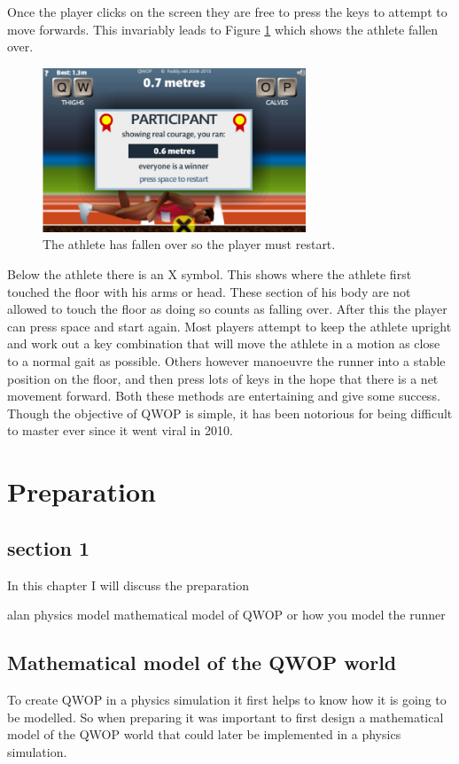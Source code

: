 \documentclass[12pt,a4paper,twoside,openright]{report}
\begin{document}
Once the player clicks on the screen they are free to press the keys to attempt to move forwards. This invariably leads to Figure \ref{fallen} which shows the athlete fallen over. 
\begin{figure}[htbp]
	\centering
	\includegraphics[width=0.7\textwidth]{qwopFallen.PNG}
	\caption{The athlete has fallen over so the player must restart.}
	\label{fallen}
\end{figure}
Below the athlete there is an X symbol. This shows where the athlete first touched the floor with his arms or head. These section of his body are not allowed to touch the floor as doing so counts as falling over. After this the player can press space and start again.
Most players attempt to keep the athlete upright and work out a key combination that will move the athlete in a motion as close to a normal gait as possible.
Others however manoeuvre the runner into a stable position on the floor, and then press lots of keys in the hope that there is a net movement forward.
Both these methods are entertaining and give some success.
Though the objective of QWOP is simple, it has been notorious for being difficult to master ever since it went viral in 2010.




\chapter{Preparation}
\section{section 1}

In this chapter I will discuss the preparation 

alan physics model
	mathematical model of QWOP
or 
how you model the runner

\section{Mathematical model of the QWOP world}
\label{mathModel}
To create QWOP in a physics simulation it first helps to know how it is going to be modelled. So when preparing it was important to first design a mathematical model of the QWOP world that could later be implemented in a physics simulation.
\end{document}
